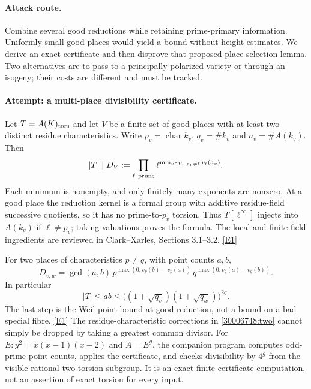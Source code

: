 \documentclass[11pt,a4paper]{article}
\newcommand{\eref}[2]{\hyperlink{extra:#1:#2}{[E#2]}}
\numberwithin{equation}{section}
\begin{document}
\paragraph{Attack route.}
Combine several good reductions while retaining prime-primary information.
Uniformly small good places would yield a bound without height estimates.
We derive an exact certificate and then disprove that proposed place-selection
lemma. Two alternatives are to pass to a principally polarized variety or
through an isogeny; their costs are different and must be tracked.

\paragraph{Attempt: a multi-place divisibility certificate.}
Let $T=A(K)_{\rm tors}$ and let $V$ be a finite set of good places with at
least two distinct residue characteristics. Write $p_v=\operatorname{char}k_v$,
$q_v=\#k_v$ and $a_v=\#A(k_v)$. Then
\begin{equation}\label{30006748:certificate}
 |T|\mid D_V:=\prod_{\ell\ {\rm prime}}
       \ell^{\min_{v\in V,\ p_v\ne\ell}v_\ell(a_v)}.
\end{equation}
Each minimum is nonempty, and only finitely many exponents are nonzero.
At a good place the reduction kernel is a formal group with additive
residue-field successive quotients, so it has no prime-to-$p_v$ torsion.
Thus $T[\ell^\infty]$ injects into $A(k_v)$ if $\ell\ne p_v$; taking
valuations proves the formula. The local and finite-field ingredients are
reviewed in Clark--Xarles, Sections 3.1--3.2. \eref{30006748}{1}

For two places of characteristics $p\ne q$, with point counts $a,b$,
\begin{equation}\label{30006748:two}
 D_{v,w}=\gcd(a,b)\,
 p^{\max(0,v_p(b)-v_p(a))}\,
 q^{\max(0,v_q(a)-v_q(b))}.
\end{equation}
In particular
\[
 |T|\le ab\le\bigl((1+\sqrt{q_v})(1+\sqrt{q_w})\bigr)^{2g}.
\]
The last step is the Weil point bound at good reduction, not a bound on a
bad special fibre. \eref{30006748}{1} The residue-characteristic corrections in
\eqref{30006748:two} cannot simply be dropped by taking a greatest common divisor.
For $E:y^2=x(x-1)(x-2)$ and $A=E^g$, the companion program computes odd-prime
point counts, applies the certificate, and checks divisibility by $4^g$
from the visible rational two-torsion subgroup. It is an exact finite
certificate computation, not an assertion of exact torsion for every input.
\end{document}
